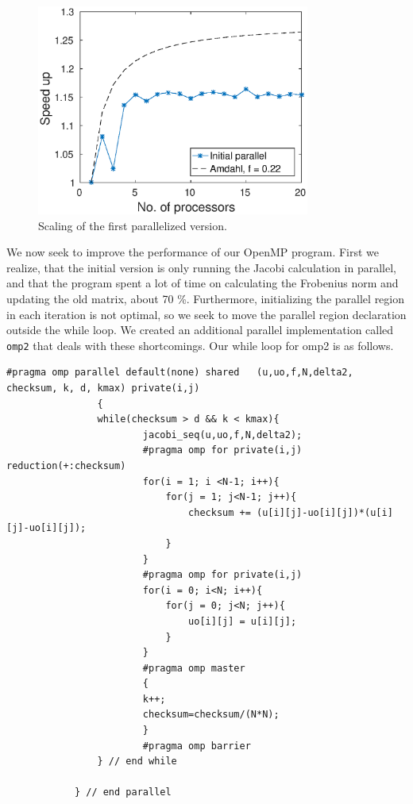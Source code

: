 \begin{figure}[h!]
\centering
\includegraphics[width = 0.8\textwidth]{fig/speedup_omp.eps}
\caption{Scaling of the first parallelized version.}
\label{fig:omp_scale1}
\end{figure}

We now seek to improve the performance of our OpenMP program. First we realize, that the initial version is only running the Jacobi calculation in parallel, and that the program spent a lot of time on calculating the Frobenius norm and updating the old matrix, about 70 \%. Furthermore, initializing the parallel region in each iteration is not optimal, so we seek to move the parallel region declaration outside the while loop. We created an additional parallel implementation called \texttt{omp2} that deals with these shortcomings. Our while loop for omp2 is as follows.

\begin{lstlisting}[caption = While loop of our optimized (omp2) program]
#pragma omp parallel default(none) shared	(u,uo,f,N,delta2, checksum, k, d, kmax) private(i,j)
				{
				while(checksum > d && k < kmax){
						jacobi_seq(u,uo,f,N,delta2);
						#pragma omp for	private(i,j)  reduction(+:checksum)
						for(i = 1; i <N-1; i++){
							for(j = 1; j<N-1; j++){
								checksum += (u[i][j]-uo[i][j])*(u[i][j]-uo[i][j]);
							}
						}
						#pragma omp for	private(i,j) 
						for(i = 0; i<N; i++){
							for(j = 0; j<N; j++){
								uo[i][j] = u[i][j];
							}
						} 
						#pragma omp master
						{
						k++;
						checksum=checksum/(N*N);		
						}
						#pragma omp barrier
				} // end while 
				
			} // end parallel

\end{lstlisting}


